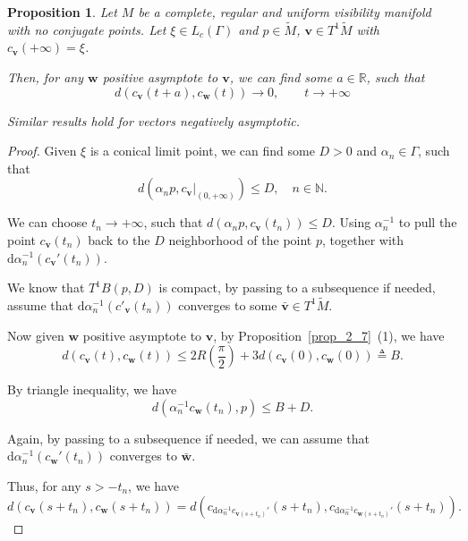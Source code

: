 \documentclass[reqno,11pt]{article}
\newtheorem{proposition}[theorem]{Proposition}
\theoremstyle{definition}
\theoremstyle{remark}
\numberwithin{equation}{section}
\begin{document}
\begin{proposition}\label{prop_6_5}
    Let $M$ be a complete, regular and uniform visibility manifold with no conjugate points. Let $\xi\in L_c(\Gamma)$ and $p\in\widetilde{M}$, $\bm{v}\in T^1\widetilde{M}$ with $c_{\bm{v}}(+\infty)=\xi$.

    Then, for any $\bm{w}$ positive asymptote to $\bm{v}$, we can find some $a\in\mathbb{R}$, such that 
    \begin{displaymath}
        d(c_{\bm{v}}(t+a),c_{\bm{w}}(t))\to0,\qquad t\to +\infty
    \end{displaymath}

    Similar results hold for vectors negatively asymptotic.
\end{proposition}

\begin{proof}
    Given $\xi$ is a conical limit point, we can find some $D>0$ and $\alpha_n\in\Gamma$, such that
    \begin{displaymath}
        d(\alpha_n p, c_{\bm{v}}\vert_{(0,+\infty)})\leq D, \quad n\in\mathbb{N}.
    \end{displaymath}

    We can choose $t_n\to+\infty$, such that $d(\alpha_n p,c_{\bm{v}}(t_n))\leq D$. Using $\alpha_n^{-1}$ to pull the point $c_{\bm{v}}(t_n)$ back to the $D$ neighborhood of the point $p$, together with $\mathrm{d}\alpha_n^{-1}(c_{\bm{v}}'(t_n))$. 
    
    We know that $T^1B(p,D)$ is compact, by passing to a subsequence if needed, assume that $\mathrm{d}\alpha_n^{-1}(c'_{\bm{v}}(t_n))$ converges to some $\bar{\bm{v}}\in T^1\widetilde{M}$.

    Now given $\bm{w}$ positive asymptote to $\bm{v}$, by Proposition~\ref{prop_2_7}~(1), we have
    \begin{displaymath}
        d(c_{\bm{v}}(t),c_{\bm{w}}(t))\leq 2R(\frac{\pi}{2})+3d(c_{\bm{v}}(0),c_{\bm{w}}(0))\triangleq B.
    \end{displaymath}

    By triangle inequality, we have
    \begin{displaymath}
        d(\alpha_n^{-1}c_{\bm{w}}(t_n),p)\leq B+D.
    \end{displaymath}

    Again, by passing to a subsequence if needed, we can assume that $\mathrm{d}\alpha_n^{-1}(c_{\bm{w}}'(t_n))$ converges to $\bar{\bm{w}}$.

    Thus, for any $s>-t_n$, we have
    \begin{displaymath}
        d(c_{\bm{v}}(s+t_n),c_{\bm{w}}(s+t_n))=d(c_{\mathrm{d}\alpha_n^{-1}c_{\bm{v}(s+t_n)}'}(s+t_n),c_{\mathrm{d}\alpha_n^{-1}c_{\bm{w}(s+t_n)}'}(s+t_n)).
    \end{displaymath}


\end{proof}
\end{document}
